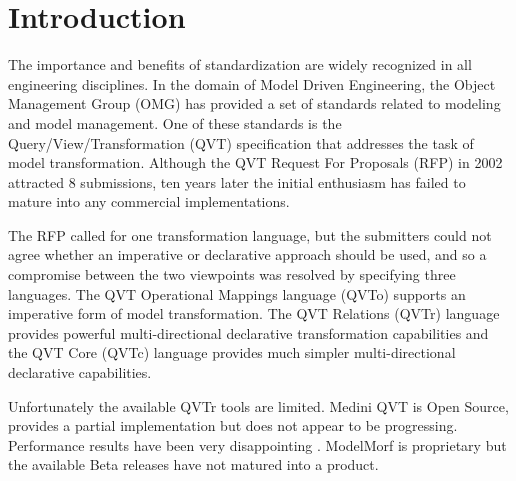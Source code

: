 %
\section{Introduction}
The importance and benefits of standardization are widely recognized in all engineering disciplines. In the domain of Model Driven Engineering, the Object Management Group (OMG)  has provided a set of standards related to modeling and model management. One of these standards is the Query/View/Transformation (QVT) specification\cite{QVT1.1} that addresses the task of model transformation. Although the QVT Request For Proposals (RFP)\cite{QVT-RFP} in 2002 attracted 8 submissions, ten years later the initial enthusiasm has failed to mature into any commercial implementations.

The RFP called for one transformation language, but the submitters could not agree whether an imperative or declarative approach should be used, and so a compromise between the two viewpoints was resolved by specifying three languages. The QVT Operational Mappings language (QVTo) supports an imperative form of model transformation. The QVT Relations (QVTr) language provides powerful multi-directional declarative transformation capabilities and the QVT Core (QVTc) language provides much simpler multi-directional declarative capabilities. 





Unfortunately the available QVTr tools are limited. Medini QVT is Open Source, provides a partial implementation but does not appear to be progressing. Performance results have been very disappointing \cite{Bosems2011}. ModelMorf is proprietary but the available Beta releases have not matured into a product.

